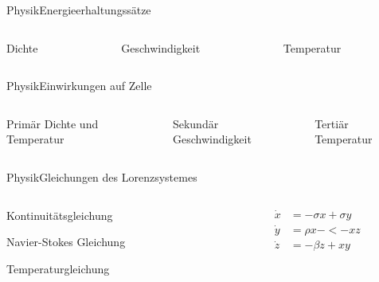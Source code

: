 \documentclass[presentation.tex]{subfiles}
\begin{document}
	\begin{frame}{Physik}{Energieerhaltungssätze}
		\begin{columns}[c]
			\begin{column}{.3\textwidth}
				Dichte
			\end{column}
			\begin{column}{.3\textwidth}
				Geschwindigkeit
			\end{column}
			\begin{column}{0.3\textwidth}
				Temperatur
			\end{column}
		\end{columns}
	\end{frame}

	\begin{frame}{Physik}{Einwirkungen auf Zelle}
		\begin{columns}[c]
			\begin{column}{.3\textwidth}
				\begin{block}{Primär}
					Dichte und Temperatur
				\end{block}
			\end{column}
			\begin{column}{.3\textwidth}
				\begin{block}{Sekundär}
					Geschwindigkeit
				\end{block}
			\end{column}
			\begin{column}{0.3\textwidth}
				\begin{block}{Tertiär}
					Temperatur
				\end{block}
			\end{column}
		\end{columns}
	\end{frame}

	\begin{frame}{Physik}{Gleichungen des Lorenzsystemes}
		\begin{columns}[c]
			\begin{column}{.5\textwidth}
				\begin{block}{Kontinuitätsgleichung}
				\end{block}
				\begin{block}{Navier-Stokes Gleichung}
				\end{block}
				\begin{block}{Temperaturgleichung}
				\end{block}
			\end{column}
			\begin{column}{.5\textwidth}
				\begin{align*}
				\dot{x} &= -\sigma x + \sigma y\\
				\dot{y} &= \rho x - <- xz\\
				\dot{z} &= -\beta z + xy\\
				\end{align*}
			\end{column}
		\end{columns}
	\end{frame}
\end{document}
